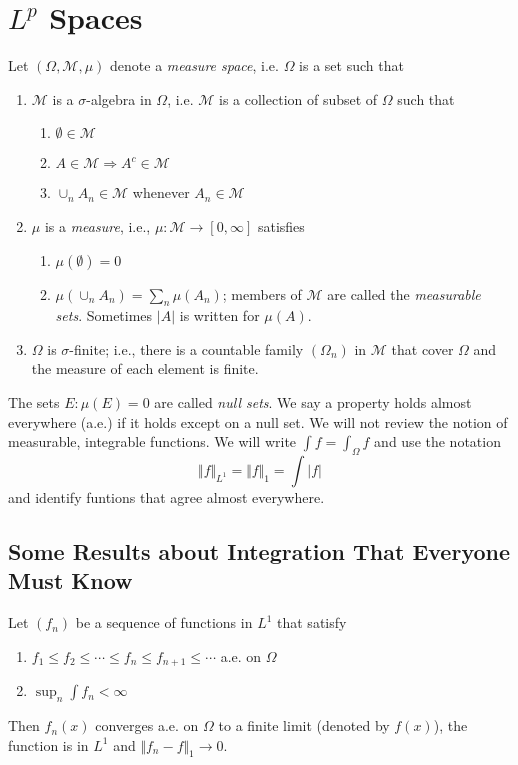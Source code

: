 \section{$L^p$ Spaces}

Let $ ( \Omega, \mathcal{M}, \mu) $ denote a \textit{measure space}, i.e. $ \Omega $ is a set such that
\begin{enumerate}
	\item $ \mathcal{M} $ is a $  \sigma $-algebra in $ \Omega $, i.e. $ \mathcal{M} $ is a collection of subset of $ \Omega $ such that
		\begin{enumerate}
			\item $ \emptyset \in \mathcal{M} $ 
			\item $ A \in \mathcal{M} \Rightarrow A^{c} \in \mathcal{M}$ 
			\item $ \cup_{n} A_{n} \in \mathcal{M}$ whenever $ A_{n} \in \mathcal{M} $
		\end{enumerate}
	\item $ \mu $ is a \textit{measure}, i.e., $ \mu: \mathcal{M} \to [0, \infty] $ satisfies
		\begin{enumerate}
			\item $ \mu( \emptyset) = 0 $
			\item $ \mu \left( \cup_{n} A_{n} \right) = \sum_{n} \mu(A_{n}) $; members of $ \mathcal{M} $ are called the \textit{measurable sets}. Sometimes $ \vert A \vert $ is written for $ \mu(A) $.
		\end{enumerate}
	\item $ \Omega $ is $ \sigma $-finite; i.e., there is a countable family $ ( \Omega_{n}) $ in $ \mathcal{M} $ that cover $ \Omega $ and the measure of each element is finite.
\end{enumerate}

The sets $ E: \mu(E) = 0 $ are called \textit{null sets}. We say a property holds almost everywhere (a.e.) if it holds except on a null set.
\indent We will not review the notion of measurable, integrable functions. We will write $ \int f = \int_{ \Omega} f$ and use the notation
\[
\Vert f \Vert_{L^{1}} = \Vert f \Vert_{1} = \int \vert f \vert
\]
and identify funtions that agree almost everywhere.

\subsection{Some Results about Integration That Everyone Must Know}

\begin{thm}
	Let $( f_{n}) $ be a sequence of functions in $ L^{1} $ that satisfy
	\begin{enumerate}
		\item $ f_{1} \leq f_{2} \leq \cdots \leq f_{n} \leq f_{n+1} \leq \cdots $ a.e. on $ \Omega $
		\item $ \sup_{n} \int f_{n} < \infty$
	\end{enumerate}
	Then $ f_{n}(x) $ converges a.e. on $ \Omega $ to a finite limit (denoted by $ f(x) $), the function is in $ L^{1} $ and $ \Vert f_{n} - f \Vert_{1} \to 0 $.
\end{thm}

